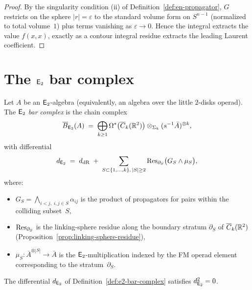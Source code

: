 \begin{proof}
By the singularity condition (ii) of
Definition~\ref{def:en-propagator}, $G$ restricts on the
sphere $|r| = \varepsilon$ to the standard volume form on $S^{n-1}$
(normalized to total volume~$1$) plus terms vanishing as
$\varepsilon \to 0$.  Hence the integral extracts the value
$f(x, x)$, exactly as a contour integral residue extracts the
leading Laurent coefficient.
\end{proof}



\section{\texorpdfstring{The $\mathsf{E}_2$ bar complex}{The E2 bar complex}}
\label{sec:e2-bar}

\begin{definition}
\label{def:e2-bar-complex}
Let $A$ be an $\mathsf{E}_2$-algebra (equivalently, an algebra over
the little $2$-disks operad).  The \emph{$\mathsf{E}_2$ bar complex}
is the chain complex
\[
\overline{B}_{\mathsf{E}_2}(A)
\;=\;
\bigoplus_{k \geq 1}
\Omega^*\bigl(\overline{C}_k(\mathbb{R}^2)\bigr)
\otimes_{\Sigma_k} (s^{-1} \bar{A})^{\otimes k},
\]
with differential
\begin{equation}\label{eq:e2-bar-diff}
d_{\mathsf{E}_2}
\;=\;
d_{\mathrm{dR}}
\;+\;
\sum_{S \subset \{1, \ldots, k\},\, |S| \geq 2}
\operatorname{Res}_{\partial_S}\bigl(G_S \wedge \mu_S\bigr),
\end{equation}
where:
\begin{itemize}
\item $G_S = \bigwedge_{i < j,\; i, j \in S} \alpha_{ij}$ is the
  product of propagators for pairs within the
  colliding subset~$S$,
\item $\operatorname{Res}_{\partial_S}$ is the linking-sphere residue along the
  boundary stratum $\partial_S$ of
  $\overline{C}_k(\mathbb{R}^2)$
  \textup{(}Proposition~\textup{\ref{prop:linking-sphere-residue})},
\item $\mu_S\colon \bar{A}^{\otimes |S|} \to \bar{A}$ is the
  $\mathsf{E}_2$-multiplication indexed by the FM operad element
  corresponding to the stratum~$\partial_S$.
\end{itemize}
\end{definition}

\begin{theorem}[\texorpdfstring{$d^2 = 0$}{d squared = 0} from Totaro relations;
\ClaimStatusProvedHere]
\label{thm:e2-d-squared}
The differential $d_{\mathsf{E}_2}$ of
Definition~\textup{\ref{def:e2-bar-complex}} satisfies
$d_{\mathsf{E}_2}^2 = 0$.
\end{theorem}

